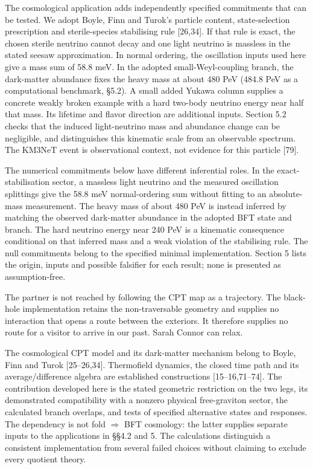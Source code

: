 \documentclass[
]{article}
\newcounter{none} %
\begin{document}
The cosmological application adds independently specified commitments
that can be tested. We adopt Boyle, Finn and Turok's particle content,
state-selection prescription and sterile-species stabilising rule
{[}26,34{]}. If that rule is exact, the chosen sterile neutrino cannot
decay and one light neutrino is massless in the stated seesaw
approximation. In normal ordering, the oscillation inputs used here give
a mass sum of 58.8 meV. In the adopted small-Weyl-coupling branch, the
dark-matter abundance fixes the heavy mass at about 480 PeV (484.8 PeV
as a computational benchmark, §5.2). A small added Yukawa column
supplies a concrete weakly broken example with a hard two-body neutrino
energy near half that mass. Its lifetime and flavor direction are
additional inputs. Section 5.2 checks that the induced light-neutrino
mass and abundance change can be negligible, and distinguishes this
kinematic scale from an observable spectrum. The KM3NeT event is
observational context, not evidence for this particle {[}79{]}.

The numerical commitments below have different inferential roles. In the
exact-stabilisation sector, a massless light neutrino and the measured
oscillation splittings give the 58.8 meV normal-ordering sum without
fitting to an absolute-mass measurement. The heavy mass of about 480 PeV
is instead inferred by matching the observed dark-matter abundance in
the adopted BFT state and branch. The hard neutrino energy near 240 PeV
is a kinematic consequence conditional on that inferred mass and a weak
violation of the stabilising rule. The null commitments belong to the
specified minimal implementation. Section 5 lists the origin, inputs and
possible falsifier for each result; none is presented as
assumption-free.

The partner is not reached by following the CPT map as a trajectory. The
black-hole implementation retains the non-traversable geometry and
supplies no interaction that opens a route between the exteriors. It
therefore supplies no route for a visitor to arrive in our past. Sarah
Connor can relax.

The cosmological CPT model and its dark-matter mechanism belong to
Boyle, Finn and Turok {[}25--26,34{]}. Thermofield dynamics, the closed
time path and its average/difference algebra are established
constructions {[}15--16,71--74{]}. The contribution developed here is
the stated geometric restriction on the two legs, its demonstrated
compatibility with a nonzero physical free-graviton sector, the
calculated branch overlaps, and tests of specified alternative states
and responses. The dependency is not fold \(\Rightarrow\) BFT cosmology:
the latter supplies separate inputs to the applications in §§4.2 and 5.
The calculations distinguish a consistent implementation from several
failed choices without claiming to exclude every quotient theory.
\end{document}
